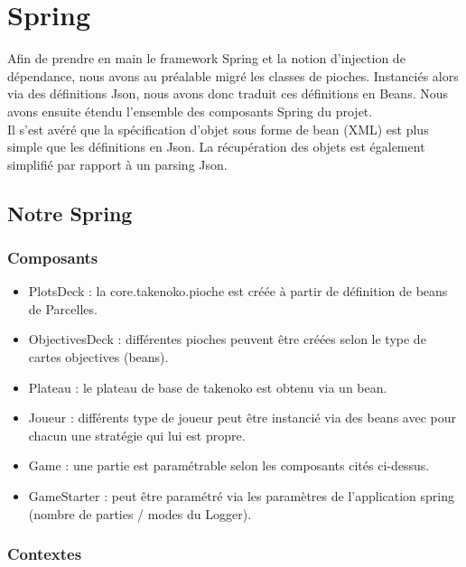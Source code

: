 \chapter{Spring}
\label{spring}

Afin de prendre en main le framework Spring et la notion d'injection de dépendance, nous avons au préalable migré les classes de pioches. Instanciés alors via des définitions Json, nous avons donc traduit ces définitions en Beans. Nous avons ensuite étendu l'ensemble des composants Spring du projet.\\
Il s'est avéré que la spécification d'objet sous forme de bean (XML) est plus simple que les définitions en Json. La récupération des objets est également simplifié par rapport à un parsing Json.

\section{Notre Spring}

\subsection{Composants}

\begin{itemize}
   \item PlotsDeck : la core.takenoko.pioche est créée à partir de définition de beans de Parcelles.\\ \item ObjectivesDeck : différentes pioches peuvent être créées selon le type de cartes objectives (beans).\\ \item Plateau : le plateau de base de takenoko est obtenu via un bean.\\ \item Joueur : différents type de joueur peut être instancié via des beans avec pour chacun une stratégie qui lui est propre.\\ \item Game : une partie est paramétrable selon les composants cités ci-dessus.\\ \item GameStarter : peut être paramétré via les paramètres de l'application spring (nombre de parties / modes du Logger).
\end{itemize}

\subsection{Contextes}


